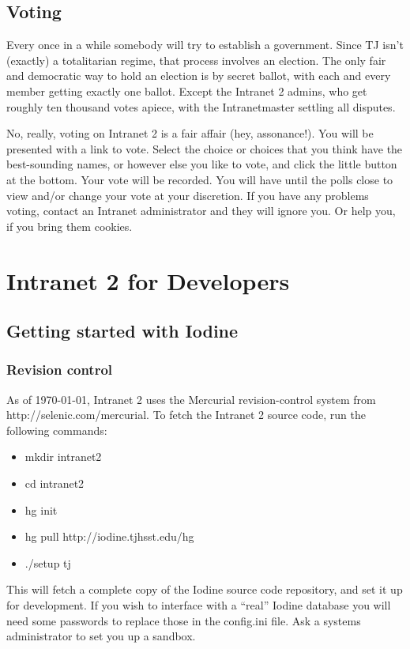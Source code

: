 \documentclass[11pt,letterpaper]{report}
\begin{document}
\section{Voting}
Every once in a while somebody will try to establish a government.  Since TJ
isn't (exactly) a totalitarian regime, that process involves an election.
The only fair and democratic way to hold an election is by secret ballot, with
each and every member getting exactly one ballot.  Except the Intranet 2 admins,
who get roughly ten thousand votes apiece, with the Intranetmaster settling all
disputes.

No, really, voting on Intranet 2 is a fair affair (hey, assonance!).  You will
be presented with a link to vote.  Select the choice or choices that you think
have the best-sounding names, or however else you like to vote, and click the
little button at the bottom.  Your vote will be recorded.  You will have until
the polls close to view and/or change your vote at your discretion.  If you have
any problems voting, contact an Intranet administrator and they will ignore you.
Or help you, if you bring them cookies.
\chapter{Intranet 2 for Developers}
\section{Getting started with Iodine}
\subsection{Revision control}
As of \today , Intranet 2 uses the Mercurial revision-control system from http://selenic.com/mercurial.  
To fetch the Intranet 2 source code, run the following commands:
\begin{itemize}
	\item mkdir intranet2
	\item cd intranet2
	\item hg init
	\item hg pull http://iodine.tjhsst.edu/hg
	\item ./setup tj
\end{itemize}
This will fetch a complete copy of the Iodine source code repository, and
set it up for development.  If you wish to interface with a ``real''
Iodine database you will need some passwords to replace those in the config.ini
file.  Ask a systems administrator to set you up a sandbox.
\end{document}
